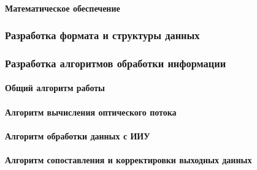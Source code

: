 \paragraph{Математическое обеспечение}

\subsubsection{Разработка формата и структуры данных}

\subsubsection{Разработка алгоритмов обработки информации}
\paragraph{Общий алгоритм работы}
\paragraph{Алгоритм вычисления оптического потока}
\paragraph{Алгоритм обработки данных с ИИУ}
\paragraph{Алгоритм сопоставления и корректировки выходных данных}

